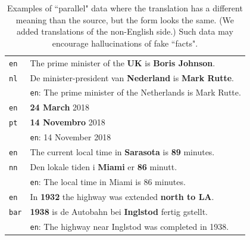 \begin{table}[t!]

    \centering\small
    \begin{tabular}{ll}
        \toprule

        \texttt{en}  & The prime minister of the \textbf{UK} is \textbf{Boris Johnson}.          \\
        \texttt{nl}  & De minister-president van \textbf{Nederland} is \textbf{Mark Rutte}.      \\
                     & \small{\texttt{en}: The prime minister of the Netherlands is Mark Rutte.} \\
        \midrule
        \texttt{en}  & \textbf{24 March} 2018                                                    \\
        \texttt{pt}  & \textbf{14 Novembro} 2018                                                 \\
                     & \small{\texttt{en}: 14 November 2018 }                                    \\
        \midrule
        \texttt{en}  & The current local time in \textbf{Sarasota} is \textbf{89} minutes.       \\
        \texttt{nn}  & Den lokale tiden i \textbf{Miami} er \textbf{86} minutt.                  \\
                     & \small{\texttt{en}: The local time in Miami is 86 minutes.}               \\
        \midrule
        \texttt{en}  & In \textbf{1932} the highway was extended \textbf{north to LA}.           \\
        \texttt{bar} & \textbf{1938} is de Autobahn bei \textbf{Inglstod} fertig gstellt.        \\
                     & \small{\texttt{en}: The highway near Inglstod was completed in 1938.}     \\
        \bottomrule
    \end{tabular}%
    \caption{Examples of ``parallel" data where the translation has a different meaning than the source, but the form looks the same. (We added translations of the non-English side.) Such data may encourage hallucinations of fake ``facts".}
    \label{tab:not_actually_parallel}
\end{table}

